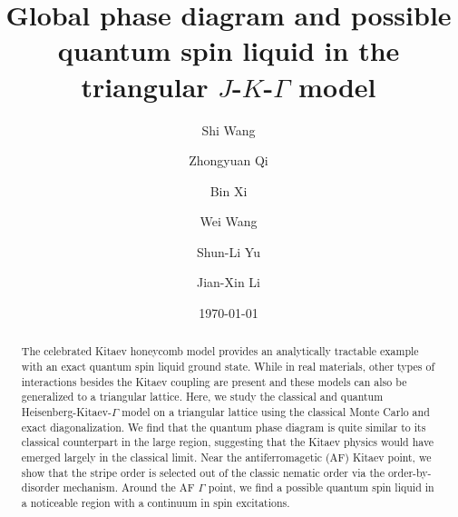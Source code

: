 \documentclass[aps,prb,reprint,amsfonts,amsmath,amssymb,showpacs,groupedaddress,superscriptaddress]{revtex4-1}
\begin{document}
\title{Global phase diagram and possible quantum spin liquid in the triangular $J$-$K$-$\Gamma$ model}

\author{Shi Wang}

\author{Zhongyuan Qi}

\author{Bin Xi}

\author{Wei Wang}

\author{Shun-Li Yu}

\author{Jian-Xin Li}

\date{\today}

\begin{abstract}
The celebrated Kitaev honeycomb model provides an analytically tractable example with an exact quantum spin liquid ground state. While in real materials, other types of interactions besides the Kitaev coupling are present and these models can also be generalized to a triangular lattice. Here, we study the classical and quantum Heisenberg-Kitaev-$\Gamma$ model on a triangular lattice using the classical Monte Carlo and exact diagonalization. We find that the quantum phase diagram is quite similar to its classical counterpart in the large region, suggesting that the Kitaev physics would have emerged largely in the classical limit. Near the antiferromagetic (AF) Kitaev point, we show that the stripe order is selected out of the classic nematic order via the order-by-disorder mechanism. Around the AF $\Gamma$ point, we find a possible quantum spin liquid in a noticeable region with a continuum in spin excitations.
\end{abstract}
\end{document}
